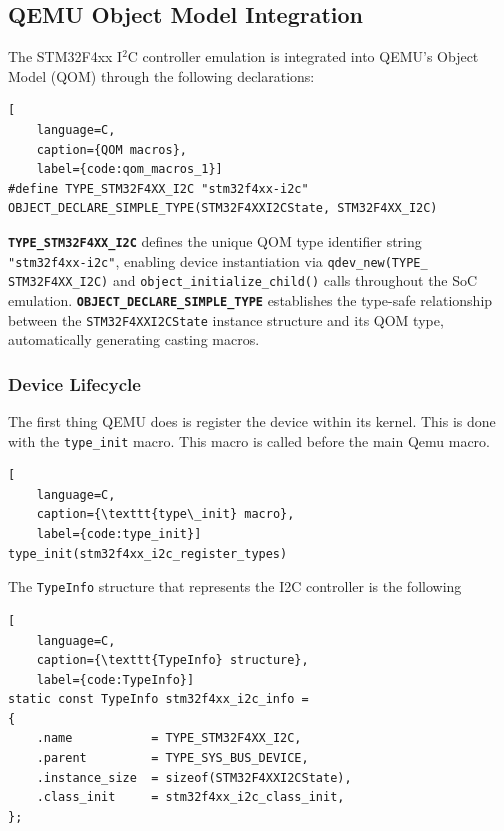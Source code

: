 \subsection{QEMU Object Model Integration}
\label{sec:imp_qom_integration}

The STM32F4xx I$^2$C controller emulation is integrated into QEMU's Object Model (QOM) through the following declarations:

\begin{lstlisting}[
    language=C,
    caption={QOM macros},
    label={code:qom_macros_1}]
#define TYPE_STM32F4XX_I2C "stm32f4xx-i2c"
OBJECT_DECLARE_SIMPLE_TYPE(STM32F4XXI2CState, STM32F4XX_I2C)
\end{lstlisting}

\textbf{\texttt{TYPE\_STM32F4XX\_I2C}} defines the unique QOM type identifier string 
\\ \texttt{"stm32f4xx-i2c"}, enabling device instantiation via \texttt{qdev\_new(TYPE\_\\STM32F4XX\_I2C)} and \texttt{object\_initialize\_child()} calls throughout the SoC emulation.
\textbf{\texttt{OBJECT\_DECLARE\_SIMPLE\_TYPE}} establishes the type-safe relationship between the \texttt{STM32F4XXI2CState} instance structure and its QOM type, automatically generating casting macros.

\subsubsection{Device Lifecycle}
\label{subsec:lifecycle}

The first thing QEMU does is register the device within its kernel. This is done with the \texttt{type\_init} macro. This macro is called before the main Qemu macro.

\begin{lstlisting}[
    language=C,
    caption={\texttt{type\_init} macro},
    label={code:type_init}]
type_init(stm32f4xx_i2c_register_types)
\end{lstlisting}

The \texttt{TypeInfo} structure that represents the I2C controller is the following

\begin{lstlisting}[
    language=C,
    caption={\texttt{TypeInfo} structure},
    label={code:TypeInfo}]
static const TypeInfo stm32f4xx_i2c_info = 
{
    .name           = TYPE_STM32F4XX_I2C,
    .parent         = TYPE_SYS_BUS_DEVICE,
    .instance_size  = sizeof(STM32F4XXI2CState),
    .class_init     = stm32f4xx_i2c_class_init,
};
\end{lstlisting}

